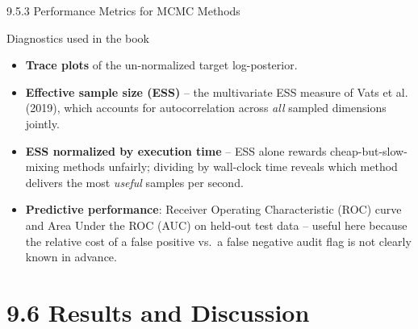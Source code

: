 \documentclass[aspectratio=169,10pt]{beamer}
\begin{document}
\begin{frame}{9.5.3 Performance Metrics for MCMC Methods}

\begin{block}{Diagnostics used in the book}
\begin{itemize}
  \item \textbf{Trace plots} of the un-normalized target log-posterior.
  \item \textbf{Effective sample size (ESS)} -- the multivariate ESS
  measure of Vats et al. (2019), which accounts for autocorrelation across
  \emph{all} sampled dimensions jointly.
  \item \textbf{ESS normalized by execution time} -- ESS alone rewards
  cheap-but-slow-mixing methods unfairly; dividing by wall-clock time
  reveals which method delivers the most \emph{useful} samples per second.
  \item \textbf{Predictive performance}: Receiver Operating Characteristic
  (ROC) curve and Area Under the ROC (AUC) on held-out test data -- useful
  here because the relative cost of a false positive vs.\ a false negative
  audit flag is not clearly known in advance.
\end{itemize}
\end{block}

\end{frame}

\section{9.6 Results and Discussion}
\end{document}
